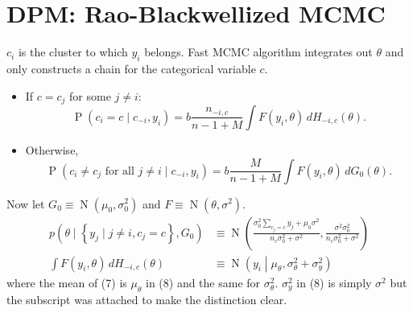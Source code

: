 \documentclass[11pt]{article}
\newcommand{\opn}{\operatorname}
\begin{document}
\section{DPM: Rao-Blackwellized MCMC}
$c_{i}$ is the cluster to which $y_{i}$ belongs. Fast MCMC algorithm integrates out $\theta$ and only constructs a chain for the categorical variable $c$.
\begin{itemize}
  \item If $c = c_{j}$ for some $j \neq i$:
    \begin{equation}
      \opn{P}\left(c_{i}=c\;|\;c_{-i}, y_{i}\right) = b\frac{n_{-i,c}}{n-1+M} \int F\left(y_{i}, \theta\right)\,dH_{-i,c}\left(\theta\right).
    \end{equation}
  \item Otherwise,
    \begin{equation}
      \opn{P}\left(c_{i}\neq c_{j}\text{ for all } j\neq i\;|\; c_{-i}, y_{i}\right) = b\frac{M}{n-1+M}\int F\left(y_{i}, \theta\right)\,dG_{0}\left(\theta\right).
    \end{equation}
\end{itemize}
Now let $G_{0} \equiv \opn{N}\left(\mu_{0}, \sigma_{0}^{2}\right)$ and $F \equiv \opn{N}\left(\theta, \sigma^{2}\right)$.
\begin{align}
  p\left(\theta\;|\;\left\{y_{j}\;|\; j\neq i, c_{j}=c\right\}, G_{0}\right) &\equiv \opn{N}\left(\frac{\sigma_{0}^{2}\sum_{c_{j}=c}y_{j} + \mu_{0}\sigma^{2}}{n_{c}\sigma_{0}^{2} + \sigma^{2}}, \frac{\sigma^{2}\sigma_{0}^{2}}{n_{c}\sigma_{0}^{2} + \sigma^{2}} \right)\\
  \int F\left(y_{i},\theta\right)\,dH_{-i,c}\left(\theta\right) &\equiv \opn{N}\left(y_{i}\middle| \mu_{\theta}, \sigma_{\theta}^{2} + \sigma_{y}^{2}\right)
\end{align}
where the mean of (7) is $\mu_{\theta}$ in (8) and the same for $\sigma_{\theta}^{2}$. $\sigma_{y}^{2}$ in (8) is simply $\sigma^{2}$ but the subscript was attached to make the distinction clear.
\end{document}
